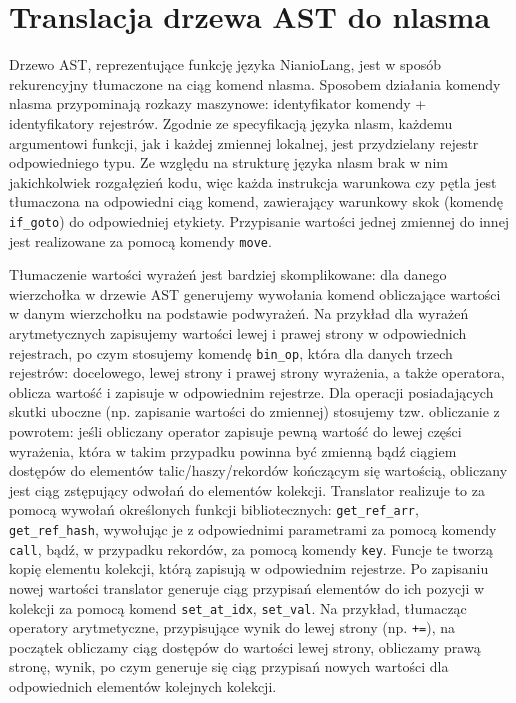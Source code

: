 \documentclass[licencjacka]{pracamgr}
\begin{document}
\section{Translacja drzewa AST do nlasma}
\label{sec:translation}
Drzewo AST, reprezentujące funkcję języka NianioLang, jest w sposób rekurencyjny tłumaczone na ciąg komend nlasma. Sposobem działania 
komendy nlasma przypominają rozkazy maszynowe: identyfikator komendy + identyfikatory rejestrów. Zgodnie ze specyfikacją języka nlasm, każdemu argumentowi funkcji, jak 
i każdej zmiennej lokalnej, jest przydzielany rejestr odpowiedniego typu. Ze względu na strukturę języka nlasm brak w nim jakichkolwiek rozgałęzień kodu, 
więc każda instrukcja warunkowa czy pętla jest tłumaczona na odpowiedni ciąg komend, zawierający warunkowy skok (komendę \texttt{if\_goto}) do 
odpowiedniej etykiety. Przypisanie wartości jednej zmiennej do innej jest realizowane za pomocą komendy \texttt{move}. 

Tłumaczenie wartości wyrażeń jest bardziej skomplikowane: dla danego wierzchołka w drzewie AST generujemy wywołania komend obliczające wartości w 
danym wierzchołku na podstawie podwyrażeń. Na przykład dla wyrażeń arytmetycznych zapisujemy wartości lewej i prawej strony w odpowiednich rejestrach, po czym 
stosujemy komendę \texttt{bin\_op}, która dla danych trzech rejestrów: docelowego, lewej strony i prawej strony wyrażenia, a także operatora, oblicza 
wartość i zapisuje w odpowiednim rejestrze. Dla operacji posiadających skutki uboczne (np. zapisanie wartości do zmiennej) stosujemy tzw. obliczanie 
z powrotem: jeśli obliczany operator zapisuje pewną wartość do lewej części wyrażenia, która w takim przypadku powinna być zmienną bądź ciągiem 
dostępów do elementów talic/haszy/rekordów kończącym się wartością, obliczany jest ciąg zstępujący odwołań do elementów kolekcji. Translator realizuje to za
pomocą wywołań określonych funkcji bibliotecznych: \texttt{get\_ref\_arr}, \texttt{get\_ref\_hash}, wywołując je z odpowiednimi parametrami za pomocą 
komendy \texttt{call}, bądź, w przypadku rekordów, za pomocą komendy \texttt{key}. Funcje te tworzą kopię elementu kolekcji, którą zapisują w 
odpowiednim rejestrze. Po zapisaniu nowej wartości translator generuje ciąg przypisań elementów do ich pozycji w kolekcji za pomocą komend 
\texttt{set\_at\_idx}, \texttt{set\_val}. Na przykład, tłumacząc operatory arytmetyczne, przypisujące wynik do lewej strony (np. \texttt{+=}), na 
początek obliczamy ciąg dostępów do wartości lewej strony, obliczamy prawą stronę, wynik, po czym generuje się ciąg przypisań nowych wartości dla odpowiednich elementów kolejnych 
kolekcji.
\end{document}
